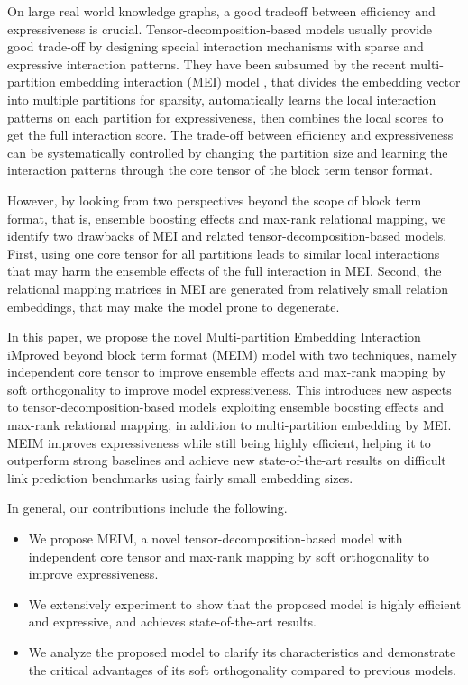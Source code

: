 \documentclass{article}
\theoremstyle{plain}
\theoremstyle{remark}
\begin{document}
On large real world knowledge graphs, a good tradeoff between efficiency and expressiveness is crucial. Tensor-decomposition-based models usually provide good trade-off by designing special interaction mechanisms with sparse and expressive interaction patterns. They have been subsumed by the recent multi-partition embedding interaction (MEI) model \cite{tran_multipartitionembeddinginteraction_2020}, that divides the embedding vector into multiple partitions for sparsity, automatically learns the local interaction patterns on each partition for expressiveness, then combines the local scores to get the full interaction score. The trade-off between efficiency and expressiveness can be systematically controlled by changing the partition size and learning the interaction patterns through the core tensor of the block term tensor format.

However, by looking from two perspectives beyond the scope of block term format, that is, ensemble boosting effects and max-rank relational mapping, we identify two drawbacks of MEI and related tensor-decomposition-based models. First, using one core tensor for all partitions leads to similar local interactions that may harm the ensemble effects of the full interaction in MEI. Second, the relational mapping matrices in MEI are generated from relatively small relation embeddings, that may make the model prone to degenerate. 

In this paper, we propose the novel Multi-partition Embedding Interaction iMproved beyond block term format (MEIM) model with two techniques, namely independent core tensor to improve ensemble effects and max-rank mapping by soft orthogonality to improve model expressiveness. This introduces new aspects to tensor-decomposition-based models exploiting ensemble boosting effects and max-rank relational mapping, in addition to multi-partition embedding by MEI. MEIM improves expressiveness while still being highly efficient, helping it to outperform strong baselines and achieve new state-of-the-art results on difficult link prediction benchmarks using fairly small embedding sizes. 

In general, our contributions include the following.
\begin{itemize}
	\item We propose MEIM, a novel tensor-decomposition-based model with independent core tensor and max-rank mapping by soft orthogonality to improve expressiveness.
	
	\item We extensively experiment to show that the proposed model is highly efficient and expressive, and achieves state-of-the-art results.
	
	\item We analyze the proposed model to clarify its characteristics and demonstrate the critical advantages of its soft orthogonality compared to previous models.
\end{itemize}
\end{document}
